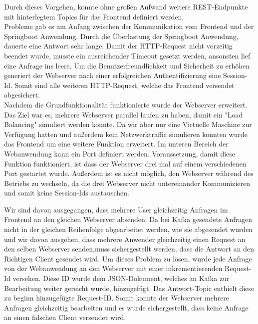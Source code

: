 Durch dieses Vorgehen, konnte ohne großen Aufwand weitere REST-Endpunkte mit hinterlegtem Topics für das Frontend definiert werden. \\

Probleme gab es am Anfang zwischen der Kommunikation vom Frontend und der Springboot Anwendung. Durch die Überlastung der Springboot Anwendung, dauerte eine Antwort sehr lange. Damit der HTTP-Request nicht vorzeitig beendet wurde, musste ein ausreichender Timeout gesetzt werden, ansonsten lief eine Anfrage ins leere. Um die Benutzerfreundlichkeit und Sicherheit zu erhöhen generiert der Webserver nach einer erfolgreichen Authentifizierung eine Session-Id. Somit sind alle weiteren HTTP-Request, welche das Frontend versendet abgesichert. \\


Nachdem die Grundfunktionalität funktionierte wurde der Webserver erweitert. \\

Das Ziel war es, mehrere Webserver parallel laufen zu haben, damit ein "Load Balancing" simuliert werden konnte. Da wir aber nur eine Virtuelle Maschine zur Verfügung hatten und außerdem kein Netzwerktraffic simulieren konnten wurde das Frontend um eine weitere Funktion erweitert.
Im unteren Bereich der Webanwendung kann ein Port definiert werden. Voraussetzung, damit diese Funktion funktioniert, ist dass der Webserver drei mal auf einem verschiedenen Port gestartet wurde. Außerdem ist es nicht möglich, den Webserver während des Betriebs zu wechseln, da die drei Webserver nicht untereinander Kommunizieren und somit keine Session-Ids austauschen.


Wir sind davon ausgegangen, dass mehrere User gleichzeitig Anfragen im Frontend an den gleichen Webserver absenden. Da bei Kafka gesendete Anfragen nicht in der gleichen Reihenfolge abgearbeitet werden, wie sie abgesendet wurden und wir davon ausgehen, dass mehrere Anwender gleichzeitig einen Request an den selben Webserver senden,muss sichergestellt werden, dass die Antwort an den Richtigen Client gesendet wird. 
Um dieses Problem zu lösen, wurde jede Anfrage von der Webanwendung an den Webserver mit einer inkrementierenden Request-Id versehen.
Diese ID wurde dem JSON-Dokument, welches an Kafka zur Bearbeitung weiter gereicht wurde, hinzugefügt. Das Antwort-Topic enthielt diese zu beginn hinzugefügte Request-ID. Somit konnte der Webserver mehrere Anfragen gleichzeitig bearbeiten und es wurde sichergestellt, dass keine Anfrage an einen falschen Client versendet wird.
